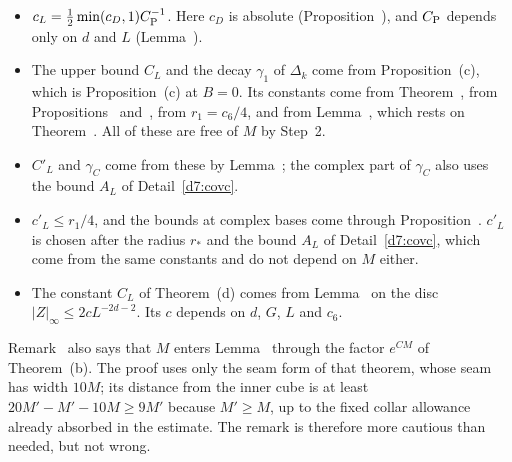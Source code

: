 \begin{detail}
\begin{step}\label{det:ledger-M0-VII}
\begin{itemize}
\item $c_L=\frac12\min(c_D,1)C_{\rm P}^{-1}$. Here $c_D$ is absolute (Proposition~), and $C_{\rm P}$ depends only on $d$ and $L$ (Lemma~).
\item The upper bound $C_L$ and the decay $\gamma_1$ of $\Delta_k$ come from Proposition~(c), which is Proposition~(c) at $B=0$. Its constants come from Theorem~, from Propositions~ and~, from $r_1=c_6/4$, and from Lemma~, which rests on Theorem~. All of these are free of $M$ by Step~2.
\item $C'_L$ and $\gamma_C$ come from these by Lemma~; the complex part of $\gamma_C$ also uses the bound $A_L$ of Detail~\ref{d7:covc}.
\item $c'_L\le r_1/4$, and the bounds at complex bases come through Proposition~. $c'_L$ is chosen after the radius $r_*$ and the bound $A_L$ of Detail~\ref{d7:covc}, which come from the same constants and do not depend on $M$ either.
\item The constant $C_L$ of Theorem~(d) comes from Lemma~ on the disc $|Z|_\infty\le2cL^{-2d-2}$. Its $c$ depends on $d$, $G$, $L$ and $c_6$.
\end{itemize}
Remark~ also says that $M$ enters Lemma~ through the factor $e^{CM}$ of Theorem~(b). The proof uses only the seam form of that theorem, whose seam has width $10M$; its distance from the inner cube is at least $20M'-M'-10M\ge9M'$ because $M'\ge M$, up to the fixed collar allowance already absorbed in the estimate. The remark is therefore more cautious than needed, but not wrong.
\end{step}


\end{detail}
